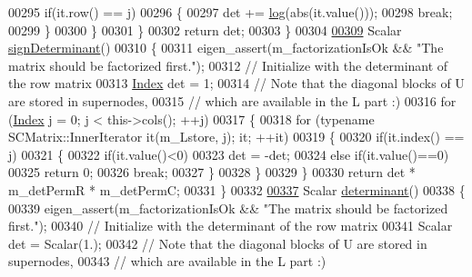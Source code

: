 \begin{DoxyCode}
00295           \textcolor{keywordflow}{if}(it.row() == j)
00296           \{
00297             det += \hyperlink{structlog}{log}(abs(it.value()));
00298             \textcolor{keywordflow}{break};
00299           \}
00300         \}
00301       \}
00302       \textcolor{keywordflow}{return} det;
00303     \}
00304 
\hyperlink{group___sparse_l_u___module_a6651143e3b18fa90cfb3808b6fd23c4e}{00309}     Scalar \hyperlink{group___sparse_l_u___module_a6651143e3b18fa90cfb3808b6fd23c4e}{signDeterminant}()
00310     \{
00311       eigen\_assert(m\_factorizationIsOk && \textcolor{stringliteral}{"The matrix should be factorized first."});
00312       \textcolor{comment}{// Initialize with the determinant of the row matrix}
00313       \hyperlink{namespace_eigen_a62e77e0933482dafde8fe197d9a2cfde}{Index} det = 1;
00314       \textcolor{comment}{// Note that the diagonal blocks of U are stored in supernodes,}
00315       \textcolor{comment}{// which are available in the  L part :)}
00316       \textcolor{keywordflow}{for} (\hyperlink{namespace_eigen_a62e77e0933482dafde8fe197d9a2cfde}{Index} j = 0; j < this->cols(); ++j)
00317       \{
00318         \textcolor{keywordflow}{for} (\textcolor{keyword}{typename} SCMatrix::InnerIterator it(m\_Lstore, j); it; ++it)
00319         \{
00320           \textcolor{keywordflow}{if}(it.index() == j)
00321           \{
00322             \textcolor{keywordflow}{if}(it.value()<0)
00323               det = -det;
00324             \textcolor{keywordflow}{else} \textcolor{keywordflow}{if}(it.value()==0)
00325               \textcolor{keywordflow}{return} 0;
00326             \textcolor{keywordflow}{break};
00327           \}
00328         \}
00329       \}
00330       \textcolor{keywordflow}{return} det * m\_detPermR * m\_detPermC;
00331     \}
00332     
\hyperlink{group___sparse_l_u___module_a02d63d242d27211b5c5827f5d4fd99ff}{00337}     Scalar \hyperlink{group___sparse_l_u___module_a02d63d242d27211b5c5827f5d4fd99ff}{determinant}()
00338     \{
00339       eigen\_assert(m\_factorizationIsOk && \textcolor{stringliteral}{"The matrix should be factorized first."});
00340       \textcolor{comment}{// Initialize with the determinant of the row matrix}
00341       Scalar det = Scalar(1.);
00342       \textcolor{comment}{// Note that the diagonal blocks of U are stored in supernodes,}
00343       \textcolor{comment}{// which are available in the  L part :)}

\end{DoxyCode}
